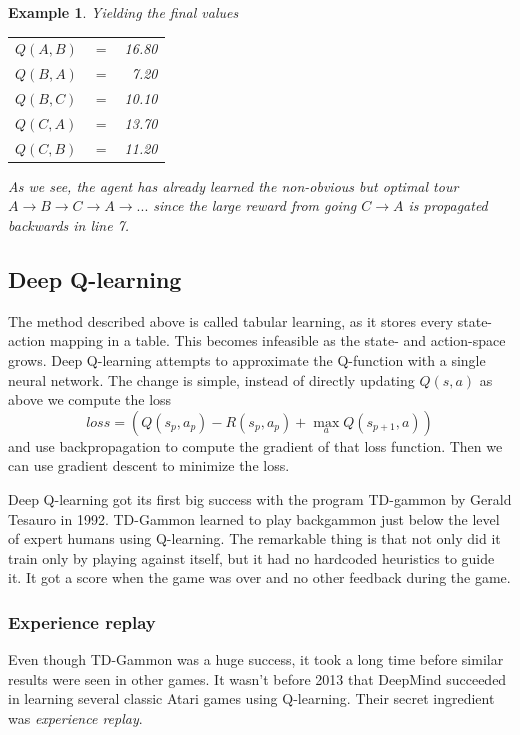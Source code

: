\documentclass{article}
\theoremstyle{changedot}
\theoremstyle{changedotbreak}
\theoremstyle{nonumberplain}
\newtheorem{example}{Example}
\begin{document}
\begin{example}
  Yielding the final values

  \begin{tabular}{l c r}
    $Q(A, B)$ & $=$ & 16.80\\
    $Q(B, A)$ & $=$ & 7.20\\
    $Q(B, C)$ & $=$ & 10.10\\
    $Q(C, A)$ & $=$ & 13.70\\
    $Q(C, B)$ & $=$ & 11.20\\
  \end{tabular}

  As we see, the agent has already learned the non-obvious but optimal tour $A \rightarrow B \rightarrow C  \rightarrow A \rightarrow ...$ since the large reward from going $C \rightarrow A$ is propagated backwards in line 7.
\end{example}


\subsection{Deep Q-learning}
The method described above is called tabular learning, as it stores every state-action mapping in a table. This becomes infeasible as the state- and action-space grows. Deep Q-learning attempts to approximate the Q-function with a single neural network. The change is simple, instead of directly updating $Q(s, a)$ as above we compute the loss \[loss = (Q(s_{p}, a_{p}) - R(s_{p}, a_{p}) + \max_{a} Q(s_{p+1}, a))\] and use backpropagation to compute the gradient of that loss function. Then we can use gradient descent to minimize the loss.

Deep Q-learning got its first big success with the program TD-gammon by Gerald Tesauro in 1992. TD-Gammon learned to play backgammon just below the level of expert humans using Q-learning. The remarkable thing is that not only did it train only by playing against itself, but it had no hardcoded heuristics to guide it. It got a score when the game was over and no other feedback during the game.

\subsubsection{Experience replay}
Even though TD-Gammon was a huge success, it took a long time before similar results were seen in other games. It wasn't before 2013 that DeepMind succeeded in learning several classic Atari games using Q-learning. Their secret ingredient was \emph{experience replay}.
\end{document}
